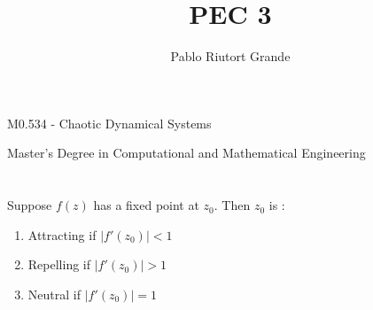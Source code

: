 \documentclass[11pt]{article}
\title{PEC 3}
\begin{document}
    \author{Pablo Riutort Grande}
    \maketitle
    
M0.534 - Chaotic Dynamical Systems

Master's Degree in Computational and Mathematical Engineering 

\hypertarget{1}{%
\section{}\label{1}}
    Suppose $f(z)$ has a fixed point at $z_0$. Then $z_0$ is \cite{chaos}:
    \begin{enumerate}
        \item Attracting if $\lvert f'(z_0) \rvert < 1$
        \item Repelling if $\lvert f'(z_0) \rvert > 1$
        \item Neutral if $\lvert f'(z_0) \rvert = 1$
    \end{enumerate}
\end{document}
